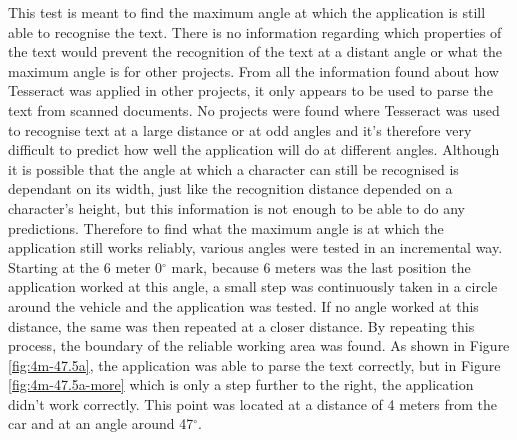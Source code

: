 This test is meant to find the maximum angle at which the application is still able to recognise the text. There is no information regarding which properties of the text would prevent the recognition of the text at a distant angle or what the maximum angle is for other projects. From all the information found about how Tesseract was applied in other projects, it only appears to be used to parse the text from scanned documents. No projects were found where Tesseract was used to recognise text at a large distance or at odd angles and it's therefore very difficult to predict how well the application will do at different angles. Although it is possible that the angle at which a character can still be recognised is dependant on its width, just like the recognition distance depended on a character's height, but this information is not enough to be able to do any predictions. Therefore to find what the maximum angle is at which the application still works reliably, various angles were tested in an incremental way. Starting at the 6 meter 0$^{\circ}$ mark, because 6 meters was the last position the application worked at this angle, a small step was continuously taken in a circle around the vehicle and the application was tested. If no angle worked at this distance, the same was then repeated at a closer distance. By repeating this process, the boundary of the reliable working area was found. As shown in Figure \ref{fig:4m-47.5a}, the application was able to parse the text correctly, but in Figure \ref{fig:4m-47.5a-more} which is only a step further to the right, the application didn't work correctly. This point was located at a distance of 4 meters from the car and at an angle around 47$^{\circ}$.

\clearpage

